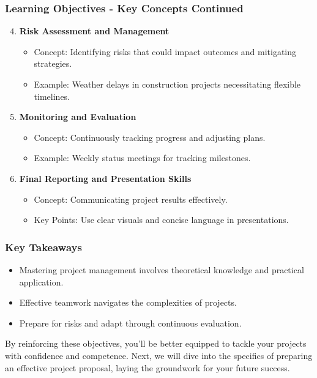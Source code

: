 \documentclass[aspectratio=169]{beamer}
\begin{document}
\begin{frame}[fragile]
    \frametitle{Learning Objectives - Key Concepts Continued}
    \begin{enumerate}
        \setcounter{enumi}{3} %
        \item \textbf{Risk Assessment and Management}
            \begin{itemize}
                \item Concept: Identifying risks that could impact outcomes and mitigating strategies.
                \item Example: Weather delays in construction projects necessitating flexible timelines.
            \end{itemize}
        
        \item \textbf{Monitoring and Evaluation}
            \begin{itemize}
                \item Concept: Continuously tracking progress and adjusting plans.
                \item Example: Weekly status meetings for tracking milestones.
            \end{itemize}
        
        \item \textbf{Final Reporting and Presentation Skills}
            \begin{itemize}
                \item Concept: Communicating project results effectively.
                \item Key Points: Use clear visuals and concise language in presentations.
            \end{itemize}
    \end{enumerate}
\end{frame}

\begin{frame}[fragile]
    \frametitle{Key Takeaways}
    \begin{itemize}
        \item Mastering project management involves theoretical knowledge and practical application.
        \item Effective teamwork navigates the complexities of projects.
        \item Prepare for risks and adapt through continuous evaluation.
    \end{itemize}
    By reinforcing these objectives, you’ll be better equipped to tackle your projects with confidence and competence. 
    Next, we will dive into the specifics of preparing an effective project proposal, laying the groundwork for your future success.
\end{frame}
\end{document}
